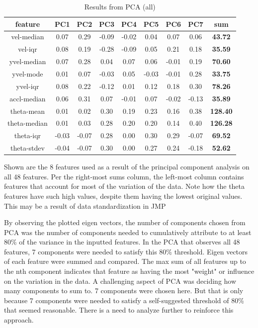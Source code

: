 \begin{table}[h!]
	\centering
	\begin{tabular}{|c|c|c|c|c|c|c|c|c|}
		\hline
		\textbf{feature} & \textbf{PC1} & \textbf{PC2} & \textbf{PC3} & \textbf{PC4} & \textbf{PC5} & \textbf{PC6} & \textbf{PC7} & \textbf{sum} \\
		\hline
		vel-median & 0.07 & 0.29 & -0.09 & -0.02 & 0.04 & 0.07 & 0.06 & \textbf{43.72} \\
		vel-iqr & 0.08 & 0.19 & -0.28 & -0.09 & 0.05 & 0.21 & 0.18 & \textbf{35.59} \\
		yvel-median & 0.07 & 0.28 & 0.04 & 0.07 & 0.06 & -0.01 & 0.19 & \textbf{70.60} \\
		yvel-mode & 0.01 & 0.07 & -0.03 & 0.05 & -0.03 & -0.01 & 0.28 & \textbf{33.75} \\
		yvel-iqr & 0.08 & 0.22 & -0.12 & 0.01 & 0.12 & 0.18 & 0.30 & \textbf{78.26} \\
		accl-median & 0.06 & 0.31 & 0.07 & -0.01 & 0.07 & -0.02 & -0.13 & \textbf{35.89} \\
		theta-mean & 0.01 & 0.02 & 0.30 & 0.19 & 0.23 & 0.16 & 0.38 & \textbf{128.40} \\
		theta-median & 0.01 & 0.03 & 0.28 & 0.20 & 0.20 & 0.14 & 0.40 & \textbf{126.28} \\
		theta-iqr & -0.03 & -0.07 & 0.28 & 0.00 & 0.30 & 0.29 & -0.07 & \textbf{69.52} \\
		theta-stdev & -0.04 & -0.07 & 0.30 & 0.00 & 0.27 & 0.24 & -0.18 & \textbf{52.62} \\
		\hline
	\end{tabular}
	\caption{Results from PCA (all)}
	{\small Shown are the 8 features used as a result of the principal component analysis on all 48 features. Per the right-most sums column, the left-most column contains features that account for most of the variation of the data. Note how the theta features have such high values, despite them having the lowest original values. This may be a result of data standardization in JMP}
	\label{tab:pca-all-results}
\end{table}

By observing the plotted eigen vectors, the number of components chosen from PCA was the number of components needed to cumulatively attribute to at least 80\% of the variance in the inputted features. In the PCA that observes all 48 features, 7 components were needed to satisfy this 80\% threshold. Eigen vectors of each feature were summed and compared. The max sum of all features up to the nth component indicates that feature as having the most "weight" or influence on the variation in the data. A challenging aspect of PCA was deciding how many components to sum to. 7 components were chosen here. But that is only because 7 components were needed to satisfy a self-suggested threshold of 80\% that seemed reasonable. There is a need to analyze further to reinforce this approach.

